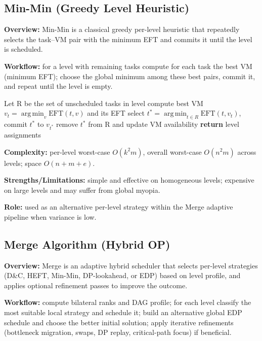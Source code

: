 \documentclass[conference]{IEEEtran}
\DeclareMathOperator*{\argmin}{arg\,min}
\newcommand{\EFT}{\mathrm{EFT}}
\begin{document}
\subsection{Min-Min (Greedy Level Heuristic)}

\textbf{Overview:} Min-Min is a classical greedy per-level heuristic
that repeatedly selects the task–VM pair with the minimum EFT and
commits it until the level is scheduled.

\textbf{Workflow:} for a level with remaining tasks compute for each
task the best VM (minimum EFT); choose the global minimum among these
best pairs, commit it, and repeat until the level is empty.

\begin{algorithm}[!t]
\caption{Min-Min Level Scheduling}
\begin{algorithmic}[1]
\STATE Let R be the set of unscheduled tasks in level
            \STATE compute best VM $v_t = \argmin_v \EFT(t,v)$ and its EFT
      \ENDFOR
      \STATE select $t^*=\argmin_{t\in R} \EFT(t,v_t)$, commit $t^*$ to $v_{t^*}$
      \STATE remove $t^*$ from R and update VM availability
\ENDWHILE
\STATE \textbf{return} level assignments
\end{algorithmic}
\end{algorithm}

\textbf{Complexity:} per-level worst-case $O(k^2 m)$, overall worst-case
$O(n^2 m)$ across levels; space $O(n+m+e)$.

\textbf{Strengths/Limitations:} simple and effective on homogeneous
levels; expensive on large levels and may suffer from global myopia.

\textbf{Role:} used as an alternative per-level strategy within the
Merge adaptive pipeline when variance is low.

\subsection{Merge Algorithm (Hybrid OP)}

\textbf{Overview:} Merge is an adaptive hybrid scheduler that selects
per-level strategies (D\&C, HEFT, Min-Min, DP-lookahead, or EDP) based
on level profile, and applies optional refinement passes to improve
the outcome.

\textbf{Workflow:} compute bilateral ranks and DAG profile; for each
level classify the most suitable local strategy and schedule it; build
an alternative global EDP schedule and choose the better initial
solution; apply iterative refinements (bottleneck migration, swaps,
DP replay, critical-path focus) if beneficial.
\end{document}
